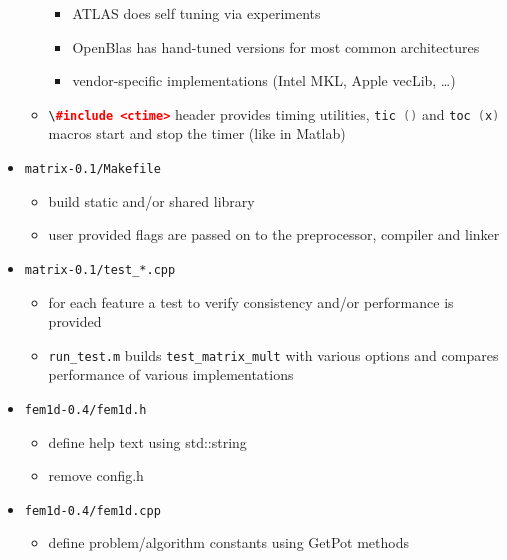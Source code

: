 \documentclass[smaller,a4paper,allowframebreaks]{beamer}
\begin{document}
\begin{frame}[allowframebreaks]
\begin{itemize}
\begin{itemize}
      \begin{itemize}
      \item ATLAS does self tuning via experiments
      \item OpenBlas has hand-tuned versions for most common architectures
      \item vendor-specific implementations (Intel MKL, Apple vecLib, \ldots)\\[3mm]
      \end{itemize} 
\item \lstinline[language=C++]{\#include <ctime>} header provides timing utilities,
      \lstinline[language=C++]{tic ()} and \lstinline[language=C++]{toc (x)} macros
      start and stop the timer (like in Matlab)
\end{itemize}
\item {\tt matrix-0.1/Makefile}\\[3mm]
\begin{itemize}
\item build static and/or shared library\\[3mm]
\item user provided flags are passed on to the preprocessor, compiler and linker
\end{itemize}
\item {\tt matrix-0.1/test\_*.cpp}\\[3mm]
\begin{itemize}
\item for each feature a test to verify consistency and/or performance is provided\\[3mm]
\item {\tt run\_test.m} builds {\tt test\_matrix\_mult} with various options and
      compares performance of various implementations\\[3mm]
\end{itemize}
\item {\tt fem1d-0.4/fem1d.h}\\[3mm]
\begin{itemize}
\item define help text using std::string\\[3mm]
\item remove config.h\\[3mm]
\end{itemize}
\item {\tt fem1d-0.4/fem1d.cpp}\\[3mm]
\begin{itemize}
\item define problem/algorithm constants using GetPot methods\\[3mm]

\end{itemize}
\end{itemize}
\end{frame}
\end{document}
